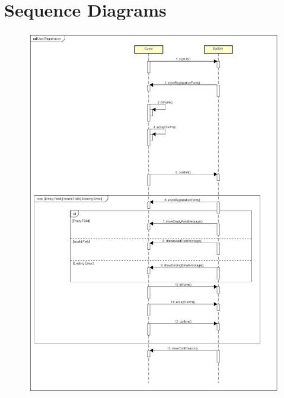 \section{Sequence Diagrams}

\begin{figure}[H]
	\includegraphics[width = \textwidth]{img/sequence1}
\end{figure}

